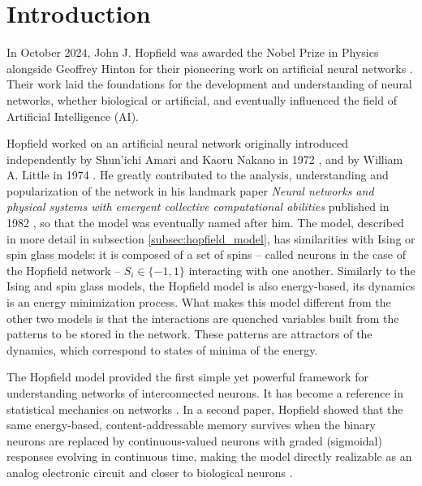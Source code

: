 \section{Introduction}


 In October 2024, John J. Hopfield was awarded the Nobel Prize in Physics alongside Geoffrey Hinton for their
pioneering work on artificial neural networks \cite{nobel2024physics}. Their work laid the foundations for the development and understanding of neural networks, whether biological or artificial, and eventually influenced the field of Artificial Intelligence (AI).

Hopfield worked on an artificial neural network originally introduced independently by Shun'ichi Amari and Kaoru Nakano in 1972 \cite{Amari1972LearningPA,Nakano1972}, and by William A. Little in 1974 \cite{Little1974}. He greatly contributed to the analysis, understanding and popularization of the network in his landmark paper \textit{Neural networks and physical systems with emergent collective computational abilities} published in 1982 \cite{Hopfield1982}, so that the model was eventually named after him. The model, described in more detail in subsection \ref{subsec:hopfield_model}, has similarities with Ising or spin glass models: it is composed of a set of spins -- called neurons in the case of the Hopfield network -- $S_i \in \{-1, 1\}$ interacting with one another. Similarly to the Ising and spin glass models, the Hopfield model is also energy-based, its dynamics is an energy minimization process. What makes this model different from the other two models is that the interactions are quenched variables built from the patterns to be stored in the network. These patterns are attractors of the dynamics, which correspond to states of minima of the energy.

The Hopfield model provided the first simple yet powerful framework for understanding networks of interconnected neurons. It has become a reference in statistical mechanics on networks \cite{Mezard2017}. In a second paper, Hopfield showed that the same energy-based, content-addressable memory survives when the binary neurons are replaced by continuous-valued neurons with graded (sigmoidal) responses evolving in continuous time, making the model directly realizable as an analog electronic circuit and closer to biological neurons \cite{Hopfield1984}.

